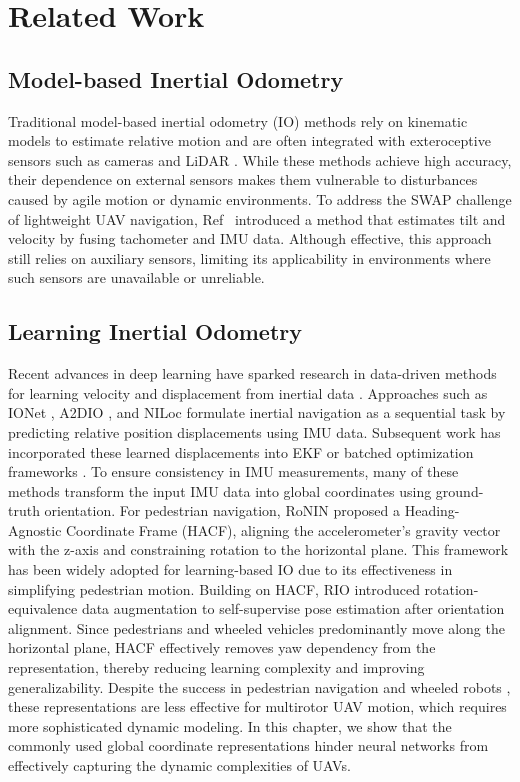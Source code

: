 \section{Related Work}
\label{sec:airio:relatedwork}

\subsection{Model-based Inertial Odometry}
Traditional model-based inertial odometry (IO) methods rely on kinematic models \cite{forster2015imu} to estimate relative motion and are often integrated with exteroceptive sensors such as cameras \cite{qin2018vins} and LiDAR \cite{zhao2021super}. While these methods achieve high accuracy, their dependence on external sensors makes them vulnerable to disturbances caused by agile motion or dynamic environments.
To address the SWAP challenge of lightweight UAV navigation, Ref~\cite{svacha2020imu} introduced a method that estimates tilt and velocity by fusing tachometer and IMU data.
Although effective, this approach still relies on auxiliary sensors, limiting its applicability in environments where such sensors are unavailable or unreliable.

\subsection{Learning Inertial Odometry}
Recent advances in deep learning have sparked research in data-driven methods for learning velocity and displacement from inertial data \cite{yan2018ridi, chen2018ionet, herath2020ronin, herath2022neural}.
Approaches such as IONet \cite{chen2018ionet}, A2DIO \cite{wang2022a2dio}, and NILoc \cite{herath2022neural} formulate inertial navigation as a sequential task by predicting relative position displacements using IMU data.
Subsequent work has incorporated these learned displacements into EKF \cite{liu2020tlio, sun2021idol, deng2023data} or batched optimization frameworks \cite{buchanan2022learning}.
To ensure consistency in IMU measurements, many of these methods transform the input IMU data into global coordinates using ground-truth orientation.
For pedestrian navigation, RoNIN \cite{herath2020ronin} proposed a Heading-Agnostic Coordinate Frame (HACF), aligning the accelerometer's gravity vector with the z-axis and constraining rotation to the horizontal plane. This framework has been widely adopted for learning-based IO \cite{liu2020tlio, sun2021idol} due to its effectiveness in simplifying pedestrian motion.
Building on HACF, RIO \cite{cao2022rio} introduced rotation-equivalence data augmentation to self-supervise pose estimation after orientation alignment.
Since pedestrians and wheeled vehicles predominantly move along the horizontal plane, HACF effectively removes yaw dependency from the representation, thereby reducing learning complexity and improving generalizability.
Despite the success in pedestrian navigation and wheeled robots \cite{herath2020ronin, brossard2019rins}, these representations are less effective for multirotor UAV motion, which requires more sophisticated dynamic modeling.
In this chapter, we show that the commonly used global coordinate representations hinder neural networks from effectively capturing the dynamic complexities of UAVs.

